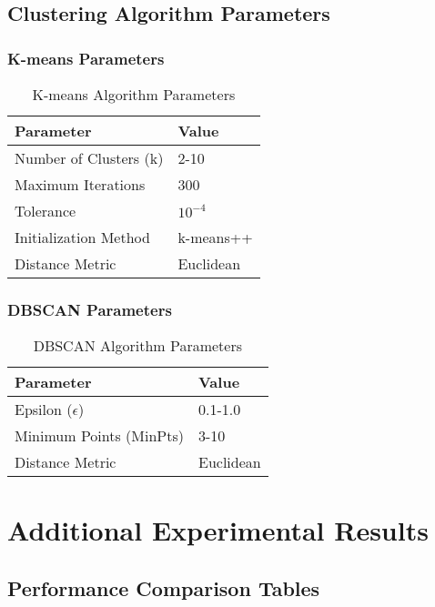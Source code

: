 \section{Clustering Algorithm Parameters}
\label{app:clustering_params}

\subsection{K-means Parameters}
\begin{table}[h]
\centering
\caption{K-means Algorithm Parameters}
\label{tab:kmeans_params}
\begin{tabular}{@{}ll@{}}
\toprule
Parameter & Value \\
\midrule
Number of Clusters (k) & 2-10 \\
Maximum Iterations & 300 \\
Tolerance & $10^{-4}$ \\
Initialization Method & k-means++ \\
Distance Metric & Euclidean \\
\bottomrule
\end{tabular}
\end{table}

\subsection{DBSCAN Parameters}
\begin{table}[h]
\centering
\caption{DBSCAN Algorithm Parameters}
\label{tab:dbscan_params}
\begin{tabular}{@{}ll@{}}
\toprule
Parameter & Value \\
\midrule
Epsilon ($\epsilon$) & 0.1-1.0 \\
Minimum Points (MinPts) & 3-10 \\
Distance Metric & Euclidean \\
\bottomrule
\end{tabular}
\end{table}

\chapter{Additional Experimental Results}
\label{app:additional_results}

\section{Performance Comparison Tables}
\label{app:performance_tables}

